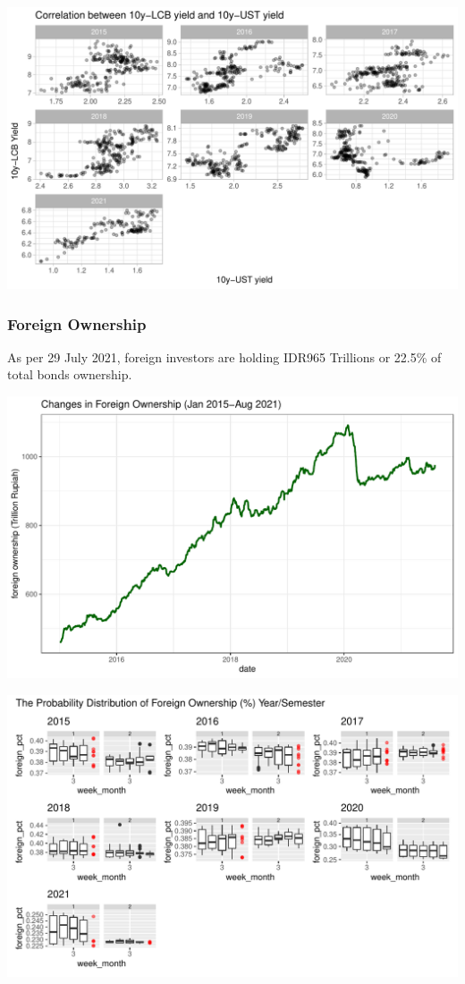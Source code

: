\documentclass[11pt,a4paper,]{article}
\begin{document}
\includegraphics{Untitled_files/figure-latex/unnamed-chunk-8-1.pdf}

\hypertarget{foreign-ownership}{%
\subsubsection{Foreign Ownership}\label{foreign-ownership}}

As per 29 July 2021, foreign investors are holding IDR965 Trillions or 22.5\% of total bonds ownership.

\includegraphics{Untitled_files/figure-latex/unnamed-chunk-10-1.pdf}

\includegraphics{Untitled_files/figure-latex/unnamed-chunk-11-1.pdf}
\end{document}
